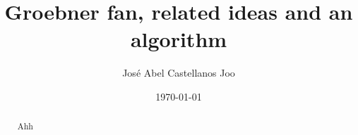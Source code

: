 \documentclass[a4paper, 11pt]{article}
\author{Jos\'e Abel Castellanos Joo}
\date{\today}
\title{Groebner fan, related ideas and an algorithm}
\begin{document}
\maketitle

\begin{abstract}
  Ahh
\end{abstract}
\end{document}
